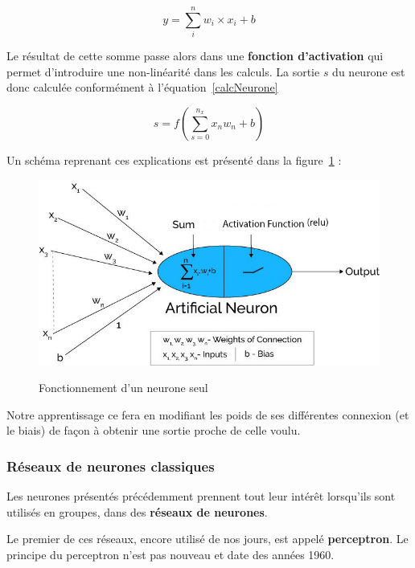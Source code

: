 \begin{equation}
\label{sommePonderee}
y = \sum_{i}^{n} w_i \times x_i + b
\end{equation}

Le résultat de cette somme passe alors dans une \textbf{fonction d'activation} qui permet d'introduire une non-linéarité dans les calculs. La sortie $s$ du neurone est donc calculée conformément à l'équation~\ref{calcNeurone}

\begin{equation}
\label{calcNeurone}
s = f(\sum_{s=0}^{n_{x}} x_{n}w_{n} + b)
\end{equation}

Un schéma reprenant ces explications est présenté dans la figure~\ref{neuroneSeul} :

\begin{figure}[h]
\includegraphics[width=16.5cm]{./images/image2.jpg}
\label{neuroneSeul}
\caption{Fonctionnement d'un neurone seul}
\end{figure}

Notre apprentissage ce fera en modifiant les poids de ses différentes
connexion (et le biais) de façon à obtenir une sortie proche de celle voulu.\newline

\subsubsection{Réseaux de neurones classiques}

Les neurones présentés précédemment prennent tout leur intérêt lorsqu'ils sont utilisés en groupes, dans des \textbf{réseaux de neurones}.

Le premier de ces réseaux, encore utilisé de nos jours, est appelé \textbf{perceptron}.
Le principe du perceptron n'est pas nouveau et date des années 1960.

